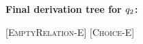 \begin{figure}
\medskip
\textbf{Final derivation tree for $\vQ_2$:}
\begin{prooftree*}
 [\textsc{EmptyRelation-E}] {\env [\dimMeta_2 \wedge \neg (\neg \vThree)] [\vSch_2] {\empRel} {}}
 [\textsc{Choice-E}] { {}}
\end{prooftree*}




\end{figure}
